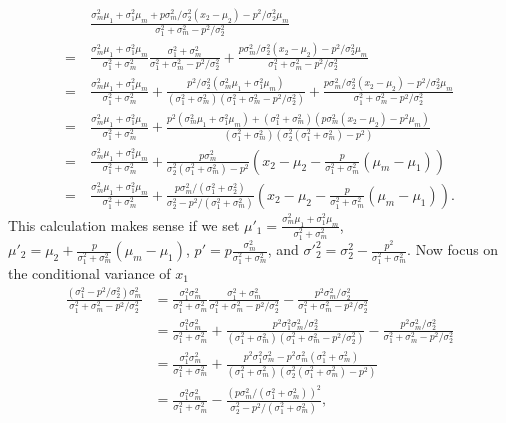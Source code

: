 \documentclass[10pt]{article}
\begin{document}
\begin{align*}
	&\frac{\sigma_m^2\mu_1 + \sigma_1^2\mu_m + p\sigma_m^2/\sigma_2^2(x_2-\mu_2)-p^2/\sigma_2^2\mu_m}{\sigma_1^2+\sigma_m^2-p^2/\sigma_2^2} \\
	= \ &\frac{\sigma_m^2\mu_1+\sigma_1^2\mu_m}{\sigma_1^2+\sigma_m^2} \frac{\sigma_1^2+\sigma_m^2}{\sigma_1^2+\sigma_m^2-p^2/\sigma_2^2} + \frac{p\sigma_m^2/\sigma_2^2(x_2-\mu_2)-p^2/\sigma_2^2\mu_m}{\sigma_1^2+\sigma_m^2-p^2/\sigma_2^2} \\
	= \ &\frac{\sigma_m^2\mu_1+\sigma_1^2\mu_m}{\sigma_1^2+\sigma_m^2} + \frac{p^2/\sigma_2^2(\sigma_m^2\mu_1+\sigma_1^2\mu_m)}{(\sigma_1^2+\sigma_m^2)(\sigma_1^2+\sigma_m^2-p^2/\sigma_2^2)} + \frac{p\sigma_m^2/\sigma_2^2(x_2-\mu_2)-p^2/\sigma_2^2\mu_m}{\sigma_1^2+\sigma_m^2-p^2/\sigma_2^2} \\
	= \ &\frac{\sigma_m^2\mu_1+\sigma_1^2\mu_m}{\sigma_1^2+\sigma_m^2} + \frac{p^2(\sigma_m^2\mu_1+\sigma_1^2\mu_m) + (\sigma_1^2+\sigma_m^2)(p\sigma_m^2(x_2-\mu_2)-p^2\mu_m)}{(\sigma_1^2+\sigma_m^2)(\sigma_2^2(\sigma_1^2+\sigma_m^2)-p^2)} \\
	= \ &\frac{\sigma_m^2\mu_1+\sigma_1^2\mu_m}{\sigma_1^2+\sigma_m^2} + \frac{p\sigma_m^2}{\sigma_2^2(\sigma_1^2+\sigma_m^2)-p^2} \left(x_2-\mu_2-\frac{p}{\sigma_1^2+\sigma_m^2}(\mu_m-\mu_1)\right) \\
	= \ &\frac{\sigma_m^2\mu_1+\sigma_1^2\mu_m}{\sigma_1^2+\sigma_m^2} + \frac{p\sigma_m^2/(\sigma_1^2+\sigma_2^2)}{\sigma_2^2-p^2/(\sigma_1^2+\sigma_m^2)} \left(x_2-\mu_2-\frac{p}{\sigma_1^2+\sigma_m^2}(\mu_m-\mu_1)\right).
\end{align*}
This calculation makes sense if we set $\mu'_1 = \frac{\sigma_m^2\mu_1+\sigma_1^2\mu_m}{\sigma_1^2+\sigma_m^2}$, $\mu'_2 = \mu_2+\frac{p}{\sigma_1^2+\sigma_m^2}(\mu_m-\mu_1)$, $p' = p\frac{\sigma_m^2}{\sigma_1^2+\sigma_m^2}$, and $\sigma'^2_2 = \sigma_2^2 - \frac{p^2}{\sigma_1^2+\sigma_m^2}$.
Now focus on the conditional variance of $x_1$
\begin{align*}
	\frac{(\sigma_1^2-p^2/\sigma_2^2)\sigma_m^2}{\sigma_1^2+\sigma_m^2-p^2/\sigma_2^2} &= \frac{\sigma_1^2\sigma_m^2}{\sigma_1^2+\sigma_m^2} \frac{\sigma_1^2+\sigma_m^2}{\sigma_1^2+\sigma_m^2-p^2/\sigma_2^2} - \frac{p^2\sigma_m^2/\sigma_2^2}{\sigma_1^2+\sigma_m^2-p^2/\sigma_2^2} \\
	&= \frac{\sigma_1^2\sigma_m^2}{\sigma_1^2+\sigma_m^2} + \frac{p^2\sigma_1^2\sigma_m^2/\sigma_2^2}{(\sigma_1^2+\sigma_m^2)(\sigma_1^2+\sigma_m^2-p^2/\sigma_2^2)} - \frac{p^2\sigma_m^2/\sigma_2^2}{\sigma_1^2+\sigma_m^2-p^2/\sigma_2^2} \\
	&= \frac{\sigma_1^2\sigma_m^2}{\sigma_1^2+\sigma_m^2} + \frac{p^2\sigma_1^2\sigma_m^2-p^2\sigma_m^2(\sigma_1^2+\sigma_m^2)}{(\sigma_1^2+\sigma_m^2)(\sigma_2^2(\sigma_1^2+\sigma_m^2)-p^2)} \\
	&= \frac{\sigma_1^2\sigma_m^2}{\sigma_1^2+\sigma_m^2} - \frac{(p\sigma_m^2/(\sigma_1^2+\sigma_m^2))^2}{\sigma_2^2-p^2/(\sigma_1^2+\sigma_m^2)},
\end{align*}
\end{document}
